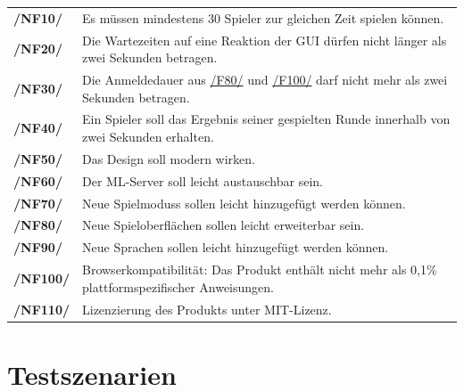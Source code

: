 \documentclass[a4paper]{scrreprt}
\begin{document}
    \begin{tabularx}{\linewidth}{@{}>{\bfseries}l@{\hspace{.5em}}X@{}}
        /NF10/ & Es müssen mindestens 30 \Gls{Spieler} zur gleichen Zeit spielen können.\\
        /NF20/ & Die Wartezeiten auf eine Reaktion der GUI dürfen nicht länger als zwei Sekunden betragen. \\
	    /NF30/ & Die Anmeldedauer aus \hyperlink{F80}{/F80/} und \hyperlink{F100}{/F100/} darf nicht mehr als zwei Sekunden betragen. \\
        /NF40/ & Ein \Gls{Spieler} soll das Ergebnis seiner gespielten Runde innerhalb von zwei Sekunden erhalten. \\
        /NF50/ & Das Design soll modern wirken. \\
        /NF60/ & Der \Gls{ML-Server} soll leicht austauschbar sein. \\
        /NF70/ & Neue \Glspl{Spielmodus} sollen leicht hinzugefügt werden können. \\
        /NF80/ & Neue Spieloberflächen sollen leicht erweiterbar sein. \\
        /NF90/ & Neue Sprachen sollen leicht hinzugefügt werden können. \\
        /NF100/ & Browserkompatibilität: Das \Gls{Produkt} enthält nicht mehr als 0,1\% plattformspezifischer Anweisungen. \\
        /NF110/ & Lizenzierung des \Gls{Produkt}s unter MIT-Lizenz.
    \end{tabularx}

    \chapter{Testszenarien}
\end{document}
